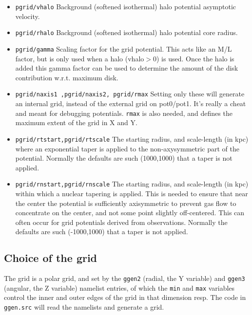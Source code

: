 \documentclass[10pt,dvips]{article}
\begin{document}
\begin{itemize}
\item
{\tt pgrid/vhalo}
Background (softened isothermal) halo potential asymptotic velocity.

\item
{\tt pgrid/rhalo}
Background (softened isothermal) halo potential core radius.

\item
{\tt pgrid/gamma}
Scaling factor for the grid potential. This acts like an M/L factor,
but is only used when a halo (vhalo$>$0) is used.
Once the halo is added  this 
gamma factor can be used to determine the amount of the
disk contribution w.r.t. maximum disk.

\item
{\tt pgrid/naxis1 ,pgrid/naxis2, pgrid/rmax}
Setting only these will generate an internal grid, instead of the
external grid on pot0/pot1. It's really a cheat and meant for 
debugging potentials. {\tt rmax} is also needed, and defines the maximum
extent of the grid in X and Y.

\item
{\tt pgrid/rtstart,pgrid/rtscale}
The starting radius, and scale-length (in kpc) where an
exponential taper is applied to the non-axysymmetric part
of the potential. Normally the defaults are such (1000,1000)
that a taper is not applied.

\item
{\tt pgrid/rnstart,pgrid/rnscale}
The starting radius, and scale-length (in kpc) within which 
a nuclear tapering is applied. This is needed to ensure that
near the center the potential is sufficiently axisymmetric
to prevent gas flow to concentrate on the center, and not
some point slightly off-centered. This can often occur for
grid potentials derived from observations. Normally the defaults
are such (-1000,1000) that a taper is not applied.


\end{itemize}


\subsection{Choice of the grid}

\bigskip

The grid is a polar grid, and set by the {\tt ggen2} (radial, the Y variable) 
and {\tt ggen3} (angular, the Z variable) namelist entries, 
of which the {\tt min} and {\tt max} variables control the 
inner and outer edges of the grid in that dimension resp. The code
in {\tt ggen.src} will read the namelists and generate a grid.
\end{document}
